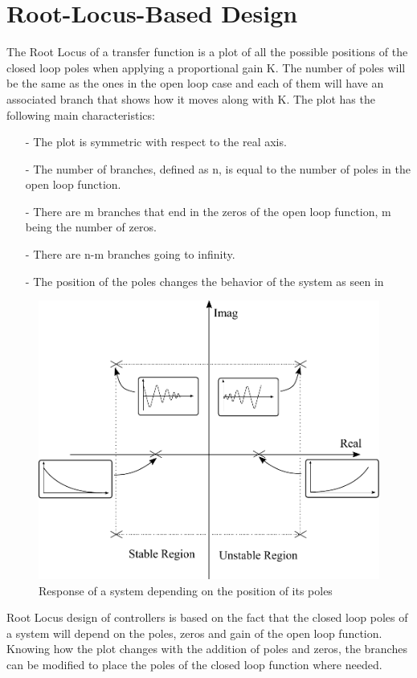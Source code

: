 \section{Root-Locus-Based Design}\label{rLocus}
The Root Locus of a transfer function is a plot of all the possible positions of the closed loop poles when applying a proportional gain K. The number of poles will be the same as the ones in the open loop case and each of them will have an associated branch that shows how it moves along with K. The plot has the following main characteristics:
%
\begin{itemize}
	\item[-] The plot is symmetric with respect to the real axis.
	\item[-] The number of branches, defined as n, is equal to the number of poles in the open loop function.
	\item[-] There are m branches that end in the zeros of the open loop function, m being the number of zeros.
	\item[-] There are n-m branches going to infinity.
	\item[-] The position of the poles changes the behavior of the system as seen in 
\end{itemize}
%
\begin{figure}[H] 
	\centering 
	\includegraphics[scale=0.55]{figures/rLocusStability}	
	\caption{Response of a system depending on the position of its poles}
	\label{rLocusStability}
\end{figure}
%
Root Locus design of controllers is based on the fact that the closed loop poles of a system will depend on the poles, zeros and gain of the open loop function. Knowing how the plot changes with the addition of poles and zeros, the branches can be modified to place the poles of the closed loop function where needed.
